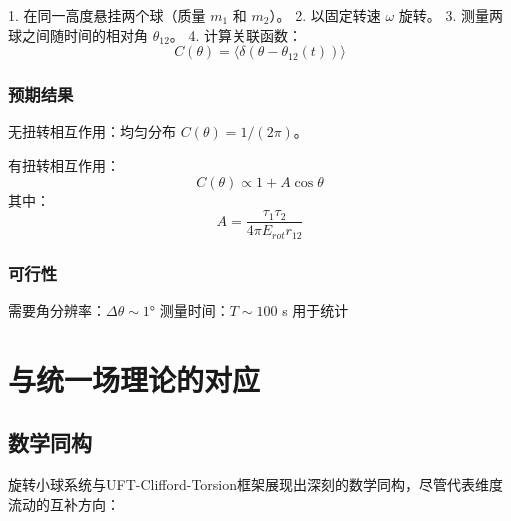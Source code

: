 \documentclass[12pt,a4paper]{article}
\begin{document}
1. 在同一高度悬挂两个球（质量 $m_1$ 和 $m_2$）。
2. 以固定转速 $\omega$ 旋转。
3. 测量两球之间随时间的相对角 $\theta_{12}$。
4. 计算关联函数：
\begin{equation}
    C(\theta) = \langle\delta(\theta - \theta_{12}(t))\rangle
\end{equation}

\subsubsection{预期结果}

无扭转相互作用：均匀分布 $C(\theta) = 1/(2\pi)$。

有扭转相互作用：
\begin{equation}
    C(\theta) \propto 1 + A\cos\theta
\end{equation}
其中：
\begin{equation}
    A = \frac{\tau_1\tau_2}{4\pi E_{rot}r_{12}}
\end{equation}

\subsubsection{可行性}

需要角分辨率：$\Delta\theta \sim 1°$  
测量时间：$T \sim 100$ s 用于统计

\section{与统一场理论的对应}
\label{sec:correspondence}

\subsection{数学同构}

旋转小球系统与UFT-Clifford-Torsion框架展现出深刻的数学同构，尽管代表维度流动的互补方向：
\end{document}

